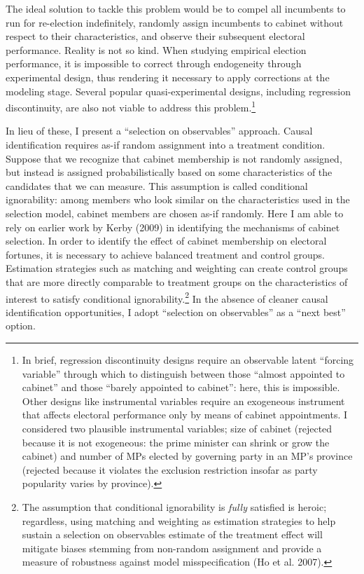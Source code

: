 \documentclass[letter,12pt]{article}
\begin{document}
The ideal solution to tackle this problem would be to compel all incumbents to run for re-election indefinitely, randomly assign incumbents to cabinet without respect to their characteristics, and observe their subsequent electoral performance. Reality is not so kind. When studying empirical election performance, it is impossible to correct through endogeneity through experimental design, thus rendering it necessary to apply corrections at the modeling stage. Several popular quasi-experimental designs, including regression discontinuity, are also not viable to address this problem.\footnote{In brief, regression discontinuity designs require an observable latent ``forcing variable'' through which to distinguish between those ``almost appointed to cabinet'' and those ``barely appointed to cabinet'': here, this is impossible. Other designs like instrumental variables require an exogeneous instrument that affects electoral performance only by means of cabinet appointments. I considered two plausible instrumental variables; size of cabinet (rejected because it is not exogeneous: the prime minister can shrink or grow the cabinet) and number of MPs elected by governing party in an MP's province (rejected because it violates the exclusion restriction insofar as party popularity varies by province).}

In lieu of these, I present a ``selection on observables'' approach. Causal identification requires as-if random assignment into a treatment condition. Suppose that we recognize that cabinet membership is not randomly assigned, but instead is assigned probabilistically based on some characteristics of the candidates that we can measure. This assumption is called conditional ignorability: among members who look similar on the characteristics used in the selection model, cabinet members are chosen as-if randomly. Here I am able to rely on earlier work by Kerby (2009) in identifying the mechanisms of cabinet selection. In order to identify the effect of cabinet membership on electoral fortunes, it is necessary to achieve balanced treatment and control groups. Estimation strategies such as matching and weighting can create control groups that are more directly comparable to treatment groups on the characteristics of interest to satisfy conditional ignorability.\footnote{The assumption that conditional ignorability is \textit{fully} satisfied is heroic; regardless, using matching and weighting as estimation strategies to help sustain a selection on observables estimate of the treatment effect will mitigate biases stemming from non-random assignment and provide a measure of robustness against model misspecification (Ho et al. 2007).} In the absence of cleaner causal identification opportunities, I adopt ``selection on observables'' as a ``next best'' option.
\end{document}
